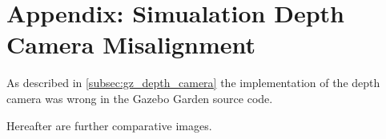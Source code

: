 \chapter{Appendix: Simualation Depth Camera Misalignment}\label{chapter:appendix:gz_depth_camera}

As described in \cref{subsec:gz_depth_camera} the implementation of the depth camera was wrong in the Gazebo Garden source code.

Hereafter are further comparative images.